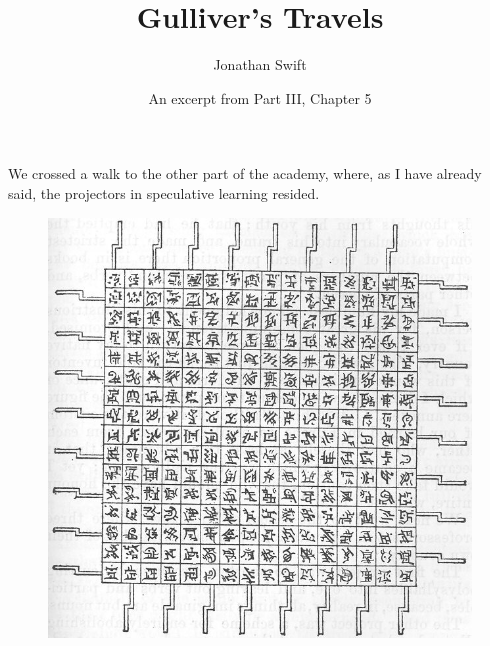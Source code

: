 \documentclass[12pt]{article}
\title{Gulliver's Travels}
\author{Jonathan Swift}
\date{An excerpt from Part III, Chapter 5\footnotemark}
\begin{document}
\maketitle
We crossed a walk to the other part of the academy, where, as I have already said, the projectors in speculative learning resided.

\begin{figure}[!h]
\begin{center}
\includegraphics{1726_Gullivers_Travels_pt3_ch5_excerpt.jpg}
\end{center}
\end{figure}
\end{document}
